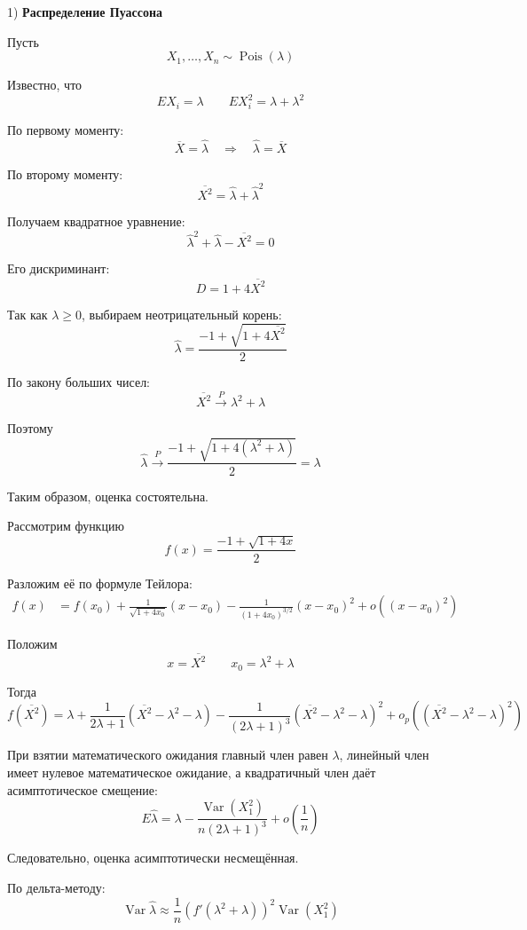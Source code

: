 \documentclass[12pt,a4paper]{article}
\begin{document}
\begin{example}

1) \textbf{Распределение Пуассона}

Пусть
\[
X_1,\ldots,X_n\sim\operatorname{Pois}(\lambda)
\]

Известно, что
\[
EX_i=\lambda
\qquad
EX_i^2=\lambda+\lambda^2
\]

По первому моменту:
\[
\overline{X}=\hat{\lambda}
\quad\Longrightarrow\quad
\hat{\lambda}=\overline{X}
\]

По второму моменту:
\[
\overline{X^2}
=
\hat{\lambda}+\hat{\lambda}^2
\]

Получаем квадратное уравнение:
\[
\hat{\lambda}^2+\hat{\lambda}-\overline{X^2}=0
\]

Его дискриминант:
\[
D=1+4\overline{X^2}
\]

Так как $\lambda\ge0$, выбираем неотрицательный корень:
\[
\hat{\lambda}
=
\frac{-1+\sqrt{1+4\overline{X^2}}}{2}
\]

По закону больших чисел:
\[
\overline{X^2}\xrightarrow{P}\lambda^2+\lambda
\]

Поэтому
\[
\hat{\lambda}
\xrightarrow{P}
\frac{-1+\sqrt{1+4(\lambda^2+\lambda)}}{2}
=\lambda
\]

Таким образом, оценка состоятельна.

Рассмотрим функцию
\[
f(x)=\frac{-1+\sqrt{1+4x}}{2}
\]

Разложим её по формуле Тейлора:
\[
\begin{aligned}
f(x)
&=
f(x_0)
+
\frac{1}{\sqrt{1+4x_0}}(x-x_0) -
\frac{1}{(1+4x_0)^{3/2}}(x-x_0)^2
+
o((x-x_0)^2)
\end{aligned}
\]

Положим
\[
x=\overline{X^2}
\qquad
x_0=\lambda^2+\lambda
\]

Тогда
\[
f(\overline{X^2})
=
\lambda
+
\frac{1}{2\lambda+1}
(\overline{X^2}-\lambda^2-\lambda)
-
\frac{1}{(2\lambda+1)^3}
(\overline{X^2}-\lambda^2-\lambda)^2
+
o_p\left(
(\overline{X^2}-\lambda^2-\lambda)^2
\right)
\]

При взятии математического ожидания главный член равен $\lambda$, линейный член имеет нулевое математическое ожидание, а квадратичный член даёт асимптотическое смещение:
\[
E\hat{\lambda}
=
\lambda
-
\frac{\operatorname{Var}(X_1^2)}
{n(2\lambda+1)^3}
+
o\left(\frac{1}{n}\right)
\]

Следовательно, оценка асимптотически несмещённая.

По дельта-методу:
\[
\operatorname{Var}\hat{\lambda}
\approx
\frac{1}{n}
\left(
f'(\lambda^2+\lambda)
\right)^2
\operatorname{Var}(X_1^2)
\]


\end{example}
\end{document}
